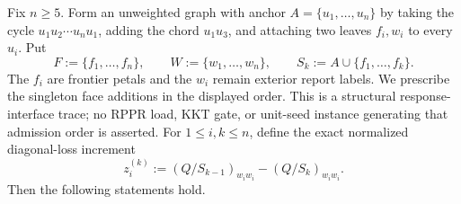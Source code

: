 \begin{proposition}
\label{prop:notched-double-sun-loss-rank}
Fix $n\geq5$.  Form an unweighted graph with anchor
$A=\{u_1,\ldots,u_n\}$ by taking the cycle
$u_1u_2\cdots u_nu_1$, adding the chord $u_1u_3$, and attaching two leaves
$f_i,w_i$ to every $u_i$.  Put
\begin{equation*}
 F:=\{f_1,\ldots,f_n\},
 \qquad
 W:=\{w_1,\ldots,w_n\},
 \qquad
 S_k:=A\cup\{f_1,\ldots,f_k\}.
\end{equation*}
The $f_i$ are frontier petals and the $w_i$ remain exterior report labels.
We prescribe the singleton face additions in the displayed order.  This is a
structural response-interface trace; no RPPR load, KKT gate, or unit-seed
instance generating that admission order is asserted.  For
$1\leq i,k\leq n$, define the exact normalized diagonal-loss increment
\begin{equation}
 z_i^{(k)}
 :=(Q/S_{k-1})_{w_iw_i}-(Q/S_k)_{w_iw_i}.
 \label{eq:notched-sun-loss-increment}
\end{equation}
Then the following statements hold.


\end{proposition}
